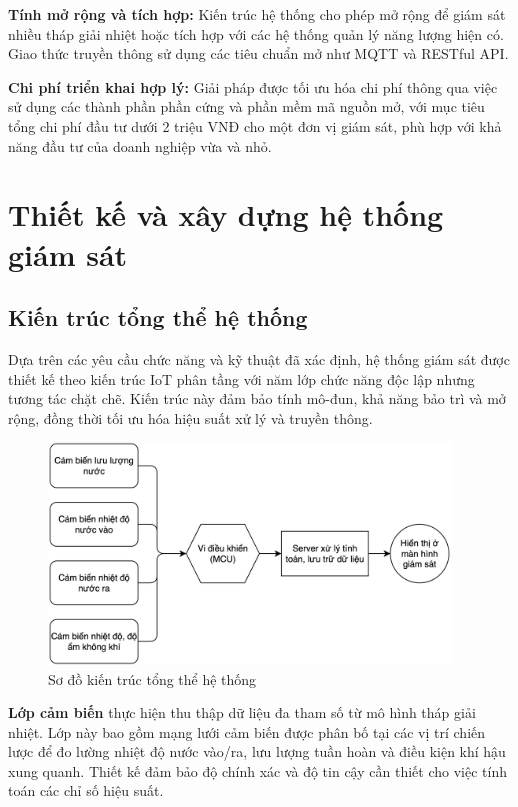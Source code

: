 \documentclass[../main.tex]{subfiles}
\begin{document}
\textbf{Tính mở rộng và tích hợp:} Kiến trúc hệ thống cho phép mở rộng để giám sát nhiều tháp giải nhiệt hoặc tích hợp với các hệ thống quản lý năng lượng hiện có. Giao thức truyền thông sử dụng các tiêu chuẩn mở như MQTT và RESTful API.

\textbf{Chi phí triển khai hợp lý:} Giải pháp được tối ưu hóa chi phí thông qua việc sử dụng các thành phần phần cứng và phần mềm mã nguồn mở, với mục tiêu tổng chi phí đầu tư dưới 2 triệu VNĐ cho một đơn vị giám sát, phù hợp với khả năng đầu tư của doanh nghiệp vừa và nhỏ.

\section{Thiết kế và xây dựng hệ thống giám sát}
\label{sec:system_design_implementation_detail}

\subsection{Kiến trúc tổng thể hệ thống}
\label{sec:system_overview}

Dựa trên các yêu cầu chức năng và kỹ thuật đã xác định, hệ thống giám sát được thiết kế theo kiến trúc IoT phân tầng với năm lớp chức năng độc lập nhưng tương tác chặt chẽ. Kiến trúc này đảm bảo tính mô-đun, khả năng bảo trì và mở rộng, đồng thời tối ưu hóa hiệu suất xử lý và truyền thông.

\begin{figure}[H]
    \centering
    \includegraphics[width=0.95\textwidth]{../Hinhve/so_do_tong_quan_he_thong.png}
    \caption{Sơ đồ kiến trúc tổng thể hệ thống}
    \label{fig:system_diagram}
\end{figure}

\textbf{Lớp cảm biến} thực hiện thu thập dữ liệu đa tham số từ mô hình tháp giải nhiệt. Lớp này bao gồm mạng lưới cảm biến được phân bố tại các vị trí chiến lược để đo lường nhiệt độ nước vào/ra, lưu lượng tuần hoàn và điều kiện khí hậu xung quanh. Thiết kế đảm bảo độ chính xác và độ tin cậy cần thiết cho việc tính toán các chỉ số hiệu suất.
\end{document}
